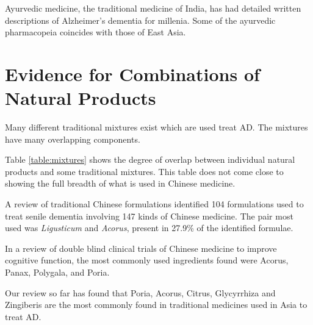 \documentclass[twocolumn]{article}
\begin{document}
Ayurvedic medicine, the traditional medicine of India,
has had detailed written descriptions of Alzheimer's dementia
for millenia.
\cite{manyam1999dementia}
Some of the ayurvedic pharmacopeia coincides with those
of East Asia.












\section{Evidence for Combinations of Natural Products}

Many different traditional mixtures exist which are used
treat AD. The mixtures have many overlapping components.

Table \ref{table:mixtures} shows the degree of overlap between
individual natural products and some traditional mixtures.
This table does not come close to showing the full breadth of
what is used in Chinese medicine.

A review of traditional Chinese formulations
identified 104 formulations used to treat senile dementia
involving 147 kinds of Chinese medicine.
The pair most used was \textit{Ligusticum} and \textit{Acorus},
present in 27.9\% of the identified formulae.
\cite{zong2014analysis}

In a review of double blind clinical trials of
Chinese medicine to improve cognitive function,
the most commonly used ingredients found were
Acorus,
Panax,
Polygala,
and Poria.

Our review so far has found that
Poria,
Acorus,
Citrus,
Glycyrrhiza and
Zingiberis are the most commonly
found in traditional medicines used in Asia to treat AD.
\end{document}
